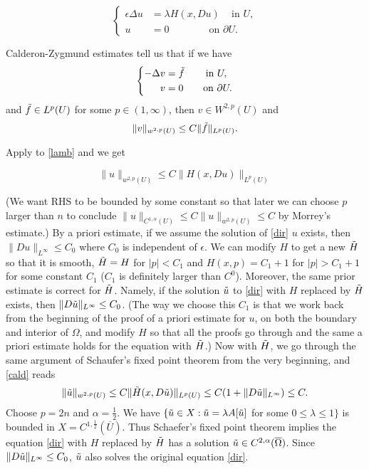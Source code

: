 \documentclass[11pt,reqno]{amsart}
\numberwithin{figure}{section}
\theoremstyle{plain}
\theoremstyle{remark}
\numberwithin{equation}{section}
\begin{document}
\begin{appendices}
\begin{equation}
\label{lamb}
\left\{
  \begin{aligned}
   \epsilon \Delta u &= \lambda H(x, Du) \quad \, \text{in } U, \\
              u &= 0 \qquad \qquad \text{on } \partial U.
  \end{aligned}
\right.
\end{equation}

\noindent Calderon-Zygmund estimates tell us that if we have
\begin{equation}
\label{cald}
\left\{
  \begin{aligned}
  - \Delta v &=\Tilde{f}   \qquad \, \text{in } U, \\
              v &= 0 \qquad \text{on } \partial U.
  \end{aligned}
\right.
\end{equation}
and $\Tilde{f} \in {L^p(U)}$ for some $p\in (1, \infty)$, then $v \in W^{2,p}(U)$ and $$\|v\|_{w^{2,p}(U)} \leq C\|\Tilde{f}\|_{L^p(U)}.$$ 

\noindent Apply to \eqref{lamb} and we get

\begin{equation}
    \|u\|_{w^{2,p}(U)} \leq C\|H(x, Du)\|_{L^p(U)}
\end{equation}


(We want RHS to be bounded by some constant so that later we can choose $p$ larger than $n$ to  conclude $ \|u\|_{C^{1, \alpha}(U)} \leq   C\|u\|_{w^{2,p}(U)} \leq C$ by Morrey's estimate.) By a priori estimate, if we assume the solution of \eqref{dir} $u$ exists, then $\| Du\|_{L^\infty} \leq C_0$ where $C_0$ is independent of $\epsilon$. We can modify $H$ to get a new $\Tilde{H}$ so that it is smooth, $\Tilde{H} = H$ for $|p|<C_1$ and $H(x,p)=C_1+1$ for $|p|>C_1+1$ for some constant $C_1$ ($C_1$ is definitely larger than $C^0$). Moreover, the same prior estimate is correct for $\Tilde{H}$. Namely, if the solution $\Tilde{u}$ to \eqref{dir} with $H$ replaced by $\Tilde{H}$ exists, then $\| D\Tilde{u}\|_{L^\infty} \leq C_0$. (The way we choose this $C_1$ is that we work back from the beginning of the proof of a priori estimate for $u$, on both the boundary and interior of $\Omega$, and modify $H$ so that all the proofs go through and the same a priori estimate holds for the equation with $\Tilde{H}$.) Now with $\Tilde{H}$, we go through the same argument of Schaufer's fixed point theorem from the very beginning, and \eqref{cald} reads
\begin{equation}
       \|\Tilde{u}\|_{w^{2,p}(U)} \leq C\|\Tilde{H}(x, D\Tilde{u})\|_{L^p(U)} \leq C(1+\|D\Tilde{u}\|_{L^\infty}) \leq C.
\end{equation}
Choose $p=2n$ and $\displaystyle \alpha =\frac{1}{2}$. We have $\{\Tilde{u}\in X : \Tilde{u}=\lambda A[\Tilde{u}]$ for some $0 \leq  \lambda \leq 1\}$ is bounded in $X= C^{1, \frac{1}{2}}(
\overline{U})$.
Thus Schaefer's fixed point theorem implies the equation \eqref{dir} with $H$ replaced by $\Tilde{H}$ has a solution $\Tilde{u} \in C^{2,\alpha} (\overline{\Omega})$. Since $\| D\Tilde{u}\|_{L^\infty} \leq C_0$, $\Tilde{u}$ also solves the original equation \eqref{dir}.




\end{appendices}
\end{document}
